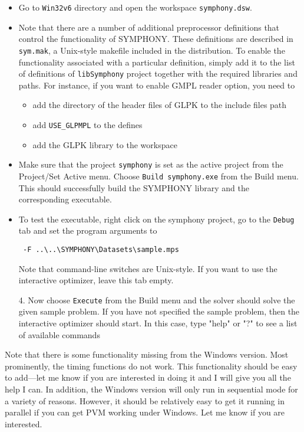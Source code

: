 \begin{itemize}

\item Go to \texttt{Win32\bs v6} directory and open the workspace 
\texttt{symphony.dsw}. 

\item Note that there are a number of additional preprocessor definitions that
control the functionality of SYMPHONY. These definitions are described in
\texttt{sym.mak}, a Unix-style makefile included in the distribution. To 
enable the functionality associated with a particular definition, simply add 
it to the list of definitions of \texttt{libSymphony} project together with 
the required libraries and paths. For instance, if you 
want to enable GMPL reader option, you need to
\begin{itemize}
  \item add the directory of the header files of GLPK to the include 
files path
  \item add \texttt{USE\_GLPMPL} to the defines
  \item add the GLPK library to the workspace
\end{itemize}
\item Make sure that the project \texttt{symphony} is set as the active 
project from the Project/Set Active menu. Choose 
\texttt{Build symphony.exe} from the Build menu. This should successfully 
build the SYMPHONY library and the corresponding executable.

\item To test the executable, right click on the symphony project, go to the
\texttt{Debug} tab and set the program arguments to 
{\color{Brown}
\begin{verbatim}
 -F ..\..\SYMPHONY\Datasets\sample.mps 
\end{verbatim}
}
Note that command-line switches are Unix-style. If you want to use the 
interactive optimizer, leave this tab empty. 

4. Now choose \texttt{Execute} from the Build menu and the solver should 
solve the given sample problem. If you have not specified the sample problem, 
then the interactive optimizer should start. In this case, 
type "help" or "?" to see a list of available commands
\end{itemize}

Note that there is some functionality missing from the Windows version. Most
prominently, the timing functions do not work. This functionality
should be easy to add---let me know if you are interested in doing it and I
will give you all the help I can. In addition, the Windows version will only
run in sequential mode for a variety of reasons. However, it should be
relatively easy to get it running in parallel if you can get PVM working under
Windows. Let me know if you are interested.

